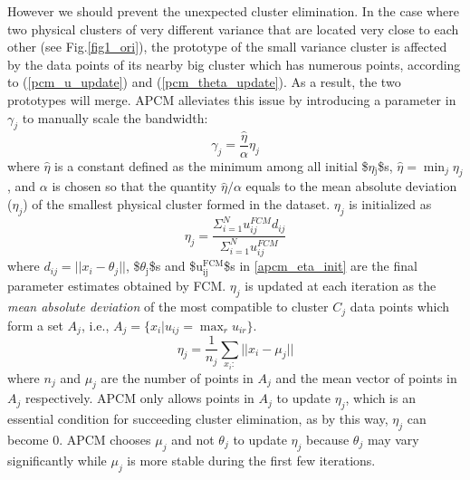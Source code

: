 \documentclass[journal]{IEEEtran}
\begin{document}
However we should prevent the unexpected cluster elimination. In the case where two physical clusters of very different variance that are located very close to each other (see Fig.\ref{fig1_ori}), the prototype of the small variance cluster is affected by the data points of its nearby big cluster which has numerous points, according to (\ref{pcm_u_update}) and (\ref{pcm_theta_update}). As a result, the two prototypes will merge. APCM alleviates this issue by introducing a parameter in $\gamma_j$ to manually scale the bandwidth:
\begin{equation}
\label{corrected_eta}
\gamma_j=\frac{\hat{\eta}}{\alpha}\eta_j
\end{equation}
where $\hat{\eta}$ is a constant defined as the minimum among all initial \$$\eta$$_{\text{j}}$\$s, $\hat{\eta}=\min_j\eta_j$, and $\alpha$ is chosen so that the quantity $\hat{\eta}/\alpha$ equals to the mean absolute deviation ($\eta_j$)  of the smallest physical cluster formed in the dataset. $\eta_j$ is initialized as
\begin{equation}
\label{apcm_eta_init}
\eta_j=\frac{\Sigma_{i=1}^Nu_{ij}^{FCM}d_{ij}}{\Sigma_{i=1}^Nu_{ij}^{FCM}}  
\end{equation}
where $d_{ij}=||x_i-\theta_j||$, \$$\theta$$_{\text{j}}$\$s and \$u$_{\text{ij}}^{\text{FCM}}$\$s in \ref{apcm_eta_init} are the final parameter estimates obtained by FCM. $\eta_j$ is updated at each iteration as the \emph{mean absolute deviation} of the most compatible to cluster $C_j$ data points which form a set $A_j$, i.e., $A_j=\{x_i|u_{ij}=\max_r u_{ir}\}$.
\begin{equation}
\label{apcm_eta_update}
\eta_j=\frac{1}{n_j}\sum_{x_i:}||x_i-\mu_j||
\end{equation}
where $n_j$ and $\mu_j$ are the number of points in $A_j$ and the mean vector of points in $A_j$ respectively. APCM only allows points in $A_j$ to update $\eta_j$, which is an essential condition for succeeding cluster elimination, as by this way, $\eta_j$ can become $0$. APCM chooses $\mu_j$ and not $\theta_j$ to update $\eta_j$ because $\theta_j$ may vary significantly while $\mu_j$ is more stable during the first few iterations.
\end{document}
